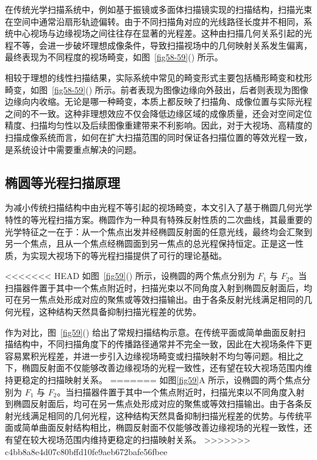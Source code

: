 在传统光学扫描系统中，例如基于振镜或多面体扫描镜实现的扫描结构，扫描光束在空间中通常沿扇形轨迹偏转。由于不同扫描角对应的光线路径长度并不相同，系统中心视场与边缘视场之间往往存在显著的光程差。这种由扫描几何关系引起的光程不等，会进一步破坏理想成像条件，导致扫描视场中的几何映射关系发生偏离，最终表现为不同程度的视场畸变，如图~\ref{fig58-59}() 所示。

相较于理想的线性扫描结果，实际系统中常见的畸变形式主要包括桶形畸变和枕形畸变，如图~\ref{fig58-59}() 所示。前者表现为图像边缘向外鼓出，后者则表现为图像边缘向内收缩。无论是哪一种畸变，本质上都反映了扫描角、成像位置与实际光程之间的不一致。这种非理想效应不仅会降低边缘区域的成像质量，还会对空间定位精度、扫描均匀性以及后续图像重建带来不利影响。因此，对于大视场、高精度的扫描成像系统而言，如何在扩大扫描范围的同时保证各扫描位置的等效光程一致，是系统设计中需要重点解决的问题。


\subsection{椭圆等光程扫描原理}\label{6.2.2}

为减小传统扫描结构中由光程不等引起的视场畸变，本文引入了基于椭圆几何光学特性的等光程扫描方案。椭圆作为一种具有特殊反射性质的二次曲线，其最重要的光学特征之一在于：从一个焦点出发并经椭圆反射面的任意光线，最终均会汇聚到另一个焦点，且从一个焦点经椭圆面到另一焦点的总光程保持恒定。正是这一性质，为实现大视场下的等光程扫描提供了可行的理论基础。

<<<<<<< HEAD
如图~\ref{fig59}() 所示，设椭圆的两个焦点分别为 $F_1$ 与 $F_2$。当扫描器件置于其中一个焦点附近时，扫描光束以不同角度入射到椭圆反射面后，均可在另一焦点处形成对应的聚焦或等效扫描输出。由于各条反射光线满足相同的几何光程，这种结构天然具备抑制扫描光程差的优势。

作为对比，图~\ref{fig59}() 给出了常规扫描结构示意。在传统平面或简单曲面反射扫描结构中，不同扫描角度下的传播路径通常并不完全一致，因此在大视场条件下更容易累积光程差，并进一步引入边缘视场畸变或扫描映射不均匀等问题。相比之下，椭圆反射面不仅能够改善边缘视场的光程一致性，还有望在较大视场范围内维持更稳定的扫描映射关系。
=======
如图\ref{fig59}A 所示，设椭圆的两个焦点分别为 $F_1$ 与 $F_2$。当扫描器件置于其中一个焦点附近时，扫描光束以不同角度入射到椭圆反射面后，均可在另一焦点处形成对应的聚焦或等效扫描输出。由于各条反射光线满足相同的几何光程，这种结构天然具备抑制扫描光程差的优势。与传统平面或简单曲面反射结构相比，椭圆反射面不仅能够改善边缘视场的光程一致性，还有望在较大视场范围内维持更稳定的扫描映射关系。
>>>>>>> c4bb8a8e4d07c80bffd10fe9aeb672bafe56fbee

